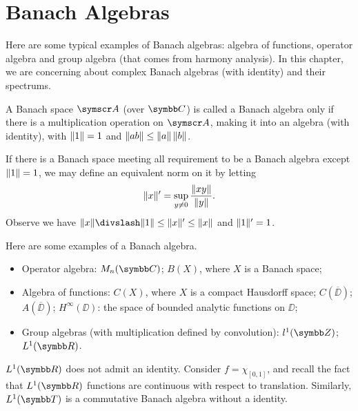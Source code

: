 
\chapter{Banach Algebras}

Here are some typical examples of Banach algebras: algebra of functions, operator algebra and group algebra (that comes from harmony analysis). In this chapter, we are concerning about complex Banach algebras (with identity) and their spectrums.

\begin{definition}
  A Banach space $\BA{A}$ (over $\CC$) is called a Banach algebra only if there is a multiplication operation on $\BA{A}$, making it into an algebra (with identity), with $\Vert1\Vert=1$ and $\Vert ab\Vert\leq \Vert a\Vert\,\Vert b\Vert$.
\end{definition}

If there is a Banach space meeting all requirement to be a Banach algebra except $\Vert1\Vert=1$, we may define an equivalent norm on it by letting
\begin{equation*}
  \Vert x\Vert'=\sup_{y\neq 0}\frac{\Vert xy\Vert}{\Vert y\Vert}.
\end{equation*}
Observe we have $\NORM{x}\DIV\NORM{1}\leq\NORM{x}'\leq\NORM{x}$ and $\Vert1\Vert'=1$.

Here are some examples of a Banach algebra.

\begin{itemize}
  \item Operator algebra: $M_n(\CC)$; $B(X)$, where $X$ is a Banach space;
  \item Algebra of functions: $C(X)$, where $X$ is a compact Hausdorff space; $C(\overline\DD)$; $A(\overline\DD)$; $H^{\infty}(\DD)$: the space of bounded analytic functions on $\DD$;
  \item Group algebras (with multiplication defined by convolution): $l^1(\ZZ)$; $L^1(\RR)$.
\end{itemize}

\begin{example}
  $L^1(\RR)$ does not admit an identity. Consider $f = \chi_{[0, 1]}$, and recall the fact that $L^1(\RR)$ functions are continuous with respect to translation. Similarly, $L^1(\TT)$ is a commutative Banach algebra without a identity.
\end{example}

